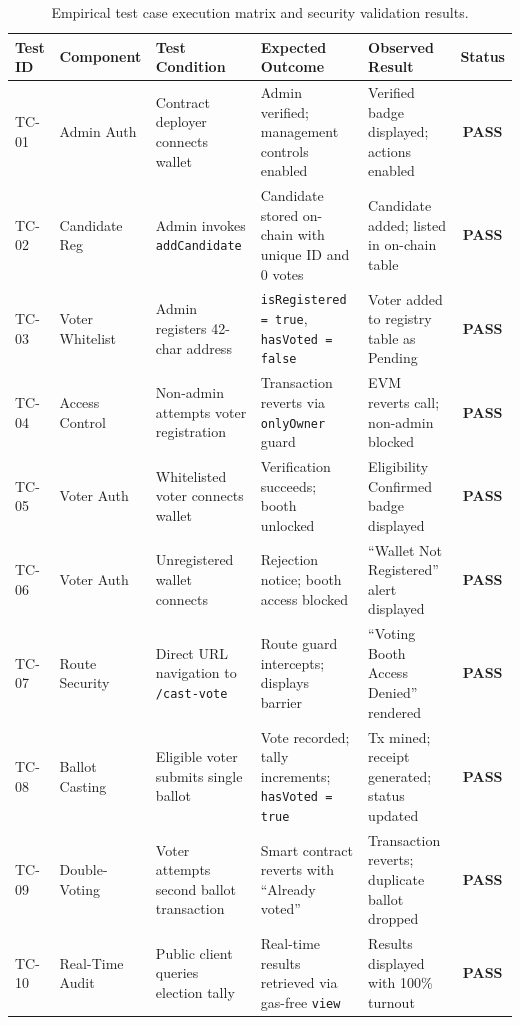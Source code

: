 \documentclass[12pt,a4paper]{report}
\begin{document}
\begin{table}[H]
\centering
\small
\caption{Empirical test case execution matrix and security validation results.}
\label{tab:test_cases}
\begin{tabularx}{\textwidth}{@{}l >{\raggedright\arraybackslash}p{2.0cm} >{\raggedright\arraybackslash}p{2.8cm} >{\raggedright\arraybackslash}X >{\raggedright\arraybackslash}X c@{}}
\toprule
\textbf{Test ID} & \textbf{Component} & \textbf{Test Condition} & \textbf{Expected Outcome} & \textbf{Observed Result} & \textbf{Status} \\
\midrule
TC-01 & Admin Auth & Contract deployer connects wallet & Admin verified; management controls enabled & Verified badge displayed; actions enabled & \textbf{PASS} \\
\addlinespace[3pt]
TC-02 & Candidate Reg & Admin invokes {\footnotesize\texttt{addCandidate}} & Candidate stored on-chain with unique ID and 0 votes & Candidate added; listed in on-chain table & \textbf{PASS} \\
\addlinespace[3pt]
TC-03 & Voter Whitelist & Admin registers 42-char address & \texttt{isRegistered = true}, \texttt{hasVoted = false} & Voter added to registry table as Pending & \textbf{PASS} \\
\addlinespace[3pt]
TC-04 & Access Control & Non-admin attempts voter registration & Transaction reverts via \texttt{onlyOwner} guard & EVM reverts call; non-admin blocked & \textbf{PASS} \\
\addlinespace[3pt]
TC-05 & Voter Auth & Whitelisted voter connects wallet & Verification succeeds; booth unlocked & Eligibility Confirmed badge displayed & \textbf{PASS} \\
\addlinespace[3pt]
TC-06 & Voter Auth & Unregistered wallet connects & Rejection notice; booth access blocked & ``Wallet Not Registered'' alert displayed & \textbf{PASS} \\
\addlinespace[3pt]
TC-07 & Route Security & Direct URL navigation to \texttt{/cast-vote} & Route guard intercepts; displays barrier & ``Voting Booth Access Denied'' rendered & \textbf{PASS} \\
\addlinespace[3pt]
TC-08 & Ballot Casting & Eligible voter submits single ballot & Vote recorded; tally increments; \texttt{hasVoted = true} & Tx mined; receipt generated; status updated & \textbf{PASS} \\
\addlinespace[3pt]
TC-09 & Double-Voting & Voter attempts second ballot transaction & Smart contract reverts with ``Already voted'' & Transaction reverts; duplicate ballot dropped & \textbf{PASS} \\
\addlinespace[3pt]
TC-10 & Real-Time Audit & Public client queries election tally & Real-time results retrieved via gas-free \texttt{view} & Results displayed with 100\% turnout & \textbf{PASS} \\
\bottomrule
\end{tabularx}
\end{table}
\end{document}
